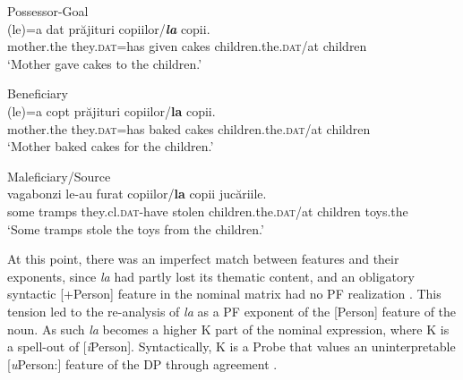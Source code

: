 \documentclass[output=paper,colorlinks,citecolor=brown,nonflat]{langsci/langscibook}
\begin{document}
\ea %
      \label{ex:cornilescu:12}
      Possessor-Goal\\
       {(le)=a} {dat} {prăjituri} copiilor/\textbf{\textit{la}} {copii.} \\
           mother.the they.\textsc{dat}=has given cakes children.the.\textsc{dat}/at children\\
      \glt ‘Mother gave cakes to the children.’
      \z



\ea%
      \label{ex:cornilescu:13}
      Beneficiary \\
       {(le)=a} {copt} prăjituri copiilor/\textbf{{la}} {copii}.\\
             mother.the they.\textsc{dat}=has baked cakes children.the.\textsc{dat}/at children\\
      \glt ‘Mother baked cakes {for} the children.’
      \z




\ea%
      \label{ex:cornilescu:14}
      Maleficiary/Source \\
       {vagabonzi} {le-au} {furat} copiilor/\textbf{la} {copii} {jucăriile.} \\
             some tramps they.cl.\textsc{dat-}have stolen children.the.\textsc{dat}/at children toys.the\\
      \glt ‘Some tramps stole the toys from the children.’
      \z

At this point, there was an imperfect match between features and their exponents, since \textit{la} had partly lost its thematic content, and an obligatory syntactic [+Person] feature in the nominal matrix had no PF realization . This tension led to the re-analysis of \textit{la} as a PF exponent of the [Person] feature of the noun. As such \textit{la} becomes a higher K part of the nominal expression, where K is a spell-out of [\textit{i}Person]. Syntactically, K is a Probe that values an uninterpretable [\textit{u}Person:{\longrule}] feature of the DP through agreement .
\end{document}
